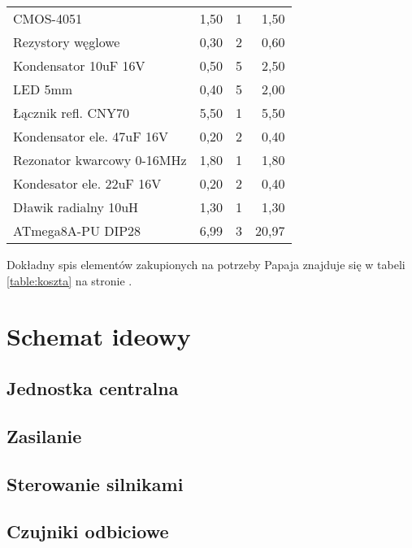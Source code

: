 \documentclass{article}
\begin{document}
\begin{table}[c]
\begin{tabular}{l|r|r|r}
CMOS-4051                     & 1,50        & 1     & 1,50         \\
Rezystory węglowe             & 0,30        & 2     & 0,60         \\
Kondensator 10uF 16V          & 0,50        & 5     & 2,50         \\
LED 5mm                       & 0,40        & 5     & 2,00         \\
Łącznik refl. CNY70           & 5,50        & 1     & 5,50         \\
Kondensator ele. 47uF 16V     & 0,20        & 2     & 0,40         \\
Rezonator kwarcowy 0-16MHz    & 1,80        & 1     & 1,80         \\
Kondesator ele. 22uF 16V      & 0,20        & 2     & 0,40         \\
Dławik radialny 10uH          & 1,30        & 1     & 1,30         \\
ATmega8A-PU DIP28             & 6,99        & 3     & 20,97        
\end{tabular}
\end{table}

Dokładny spis elementów zakupionych na potrzeby Papaja znajduje się w tabeli \ref{table:koszta} na stronie \pageref{table:koszta}.

\section{Schemat ideowy}

\subsection{Jednostka centralna}


\subsection{Zasilanie}

\subsection{Sterowanie silnikami}



\subsection{Czujniki odbiciowe}
\end{document}
